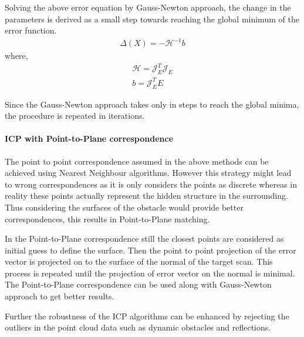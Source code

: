 Solving the above error equation by Gauss-Newton approach, the change in the parameters is derived as a small step towards reaching the global minimum of the error function.
\begin{gather}
    \Delta(X) = -\mathcal{H}^{-1} b
\end{gather}
    where,
\begin{gather}
    \mathcal{H} = \mathcal{J}_E^{T}\mathcal{J}_E\\
    b = \mathcal{J}_E^{T} E
\end{gather}

Since the Gauss-Newton approach takes only in steps to reach the global minima, the procedure is repeated in iterations.
\par
\paragraph{ICP with Point-to-Plane correspondence}
The point to point correspondence assumed in the above methods can be achieved using Nearest Neighbour algorithms. However this strategy might lead to wrong correspondences as it is only considers the points as discrete whereas in reality these points actually represent the hidden structure in the surrounding. Thus considering the surfaces of the obstacle would provide better correspondences, this results in Point-to-Plane matching.
\par
In the Point-to-Plane correspondence still the closest points are considered as initial guess to define the surface. Then the point to point projection of the error vector is projected on to the surface of the normal of the target scan. This process is repeated until the projection of error vector on the normal is minimal. The Point-to-Plane correspondence can be used along with Gauss-Newton approach to get better results.
\par
Further the robustness of the ICP algorithms can be enhanced by rejecting the outliers in the point cloud data such as dynamic obstacles and reflections.

